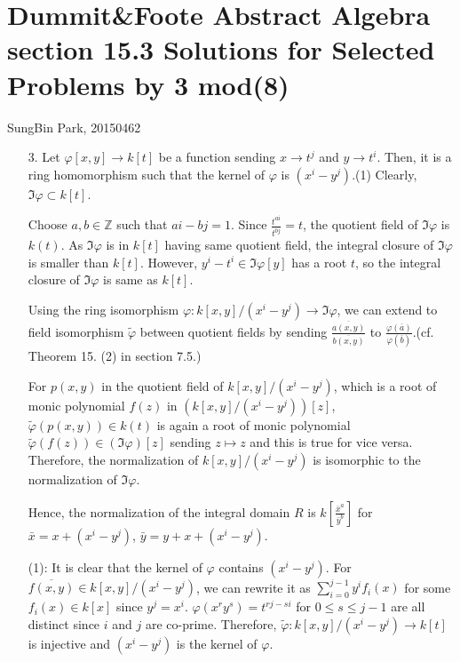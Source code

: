 \documentclass[12pt]{article}
\begin{document}
\section*{Dummit\&Foote Abstract Algebra section 15.3 Solutions for Selected Problems by 3 mod(8)}
SungBin Park, 20150462
\begin{enumerate}
\item[3.] Let $\varphi[x,y]\rightarrow k[t]$ be a function sending $x\rightarrow t^j$ and $y\rightarrow t^i$. Then, it is a ring homomorphism such that the kernel of $\varphi$ is $(x^i-y^j)$.(1) Clearly, $\Im \varphi\subset k[t]$.

Choose $a,b\in \mathbb{Z}$ such that $ai-bj=1$. Since $\frac{t^{ai}}{t^{bj}}=t$, the quotient field of $\Im \varphi$ is $k(t)$. As $\Im\varphi$ is in $k[t]$ having same quotient field, the integral closure of $\Im\varphi$ is smaller than $k[t]$. However, $y^i-t^i\in \Im\varphi[y]$ has a root $t$, so the integral closure of $\Im\varphi$ is same as $k[t]$.

Using the ring isomorphism $\varphi:k[x,y]/(x^i-y^j)\rightarrow \Im\varphi$, we can extend to field isomorphism $\tilde{\varphi}$ between quotient fields by sending $\frac{\overline{a(x,y)}}{\overline{b(x,y)}}$ to $\frac{\varphi(\overline{a})}{\varphi(\overline{b})}$.(cf. Theorem 15. (2) in section 7.5.)

For $p(x,y)$ in the quotient field of $k[x,y]/(x^i-y^j)$, which is a root of monic polynomial $f(z)$ in $\left(k[x,y]/(x^i-y^j)\right)[z]$, $\tilde{\varphi}(p(x,y))\in k(t)$ is again a root of monic polynomial $\tilde{\varphi}(f(z))\in \left(\Im \varphi\right)[z]$ sending $z\mapsto z$ and this is true for vice versa. Therefore, the normalization of $k[x,y]/(x^i-y^j)$ is isomorphic to the normalization of $\Im\varphi$.

Hence, the normalization of the integral domain $R$ is $k\left[\frac{\bar{x}^{a}}{\bar{y}^{b}}\right]$ for $\bar{x}=x+(x^i-y^j)$, $\bar{y}=y+x+(x^i-y^j)$.

(1): It is clear that the kernel of $\varphi$ contains $(x^i-y^j)$. For $\overline{f(x,y)}\in k[x,y]/(x^i-y^j)$, we can rewrite it as $\sum\limits_{i=0}^{j-1} y^i f_i(x)$ for some $f_i(x)\in k[x]$ since $y^j=x^i$. $\varphi(x^r y^s)=t^{rj-si}$ for $0\leq s\leq j-1$ are all distinct since $i$ and $j$ are co-prime. Therefore, $\tilde{\varphi}:k[x,y]/(x^i-y^j)\rightarrow k[t]$ is injective and $(x^i-y^j)$ is the kernel of $\varphi$.
\newpage



\end{enumerate}
\end{document}
